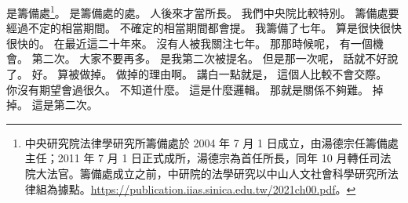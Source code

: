 \hypertarget{c01:cue:3066}{}是籌備處\footnote{中央研究院法律學研究所籌備處於 2004 年 7 月 1 日成立，由湯德宗任籌備處主任；2011 年 7 月 1 日正式成所，湯德宗為首任所長，同年 10 月轉任司法院大法官。籌備處成立之前，中研院的法學研究以中山人文社會科學研究所法律組為據點。\url{https://publication.iias.sinica.edu.tw/2021ch00.pdf}。}。
\hypertarget{c01:cue:3067}{}是籌備處的處。
\hypertarget{c01:cue:3068}{}人後來才當所長。
\hypertarget{c01:cue:3069}{}我們中央院比較特別。
\hypertarget{c01:cue:3070}{}籌備處要經過不定的相當期間。
\hypertarget{c01:cue:3071}{}不確定的相當期間都會提。
\hypertarget{c01:cue:3072}{}我籌備了七年。
\hypertarget{c01:cue:3073}{}算是很快很快很快的。
\hypertarget{c01:cue:3074}{}在最近這二十年來。
\hypertarget{c01:cue:3075}{}沒有人被我關注七年。
\hypertarget{c01:cue:3076}{}那那時候呢，
\hypertarget{c01:cue:3077}{}有一個機會。
\hypertarget{c01:cue:3078}{}第二次。
\hypertarget{c01:cue:3079}{}大家不要再多。
\hypertarget{c01:cue:3080}{}是我第二次被提名。
\hypertarget{c01:cue:3081}{}但是那一次呢，
\hypertarget{c01:cue:3082}{}話就不好說了。
\hypertarget{c01:cue:3083}{}好。
\hypertarget{c01:cue:3084}{}算被做掉。
\hypertarget{c01:cue:3085}{}做掉的理由啊。
\hypertarget{c01:cue:3086}{}講白一點就是，
\hypertarget{c01:cue:3087}{}這個人比較不會交際。
\hypertarget{c01:cue:3088}{}你沒有期望會過很久。
\hypertarget{c01:cue:3089}{}不知道什麼。
\hypertarget{c01:cue:3090}{}這是什麼邏輯。
\hypertarget{c01:cue:3091}{}那就是關係不夠難。
\hypertarget{c01:cue:3092}{}掉掉。
\hypertarget{c01:cue:3093}{}這是第二次。

